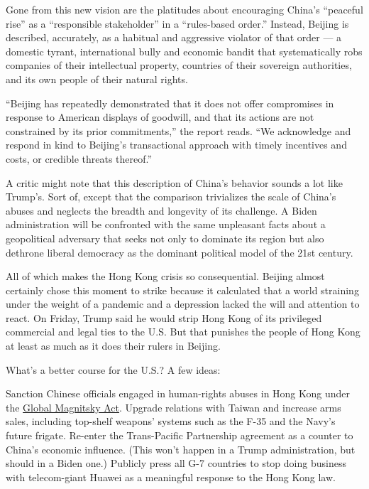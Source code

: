 Gone from this new vision are the platitudes about encouraging China's
``peaceful rise'' as a ``responsible stakeholder'' in a ``rules-based
order.'' Instead, Beijing is described, accurately, as a habitual and
aggressive violator of that order --- a domestic tyrant, international
bully and economic bandit that systematically robs companies of their
intellectual property, countries of their sovereign authorities, and its
own people of their natural rights.

``Beijing has repeatedly demonstrated that it does not offer compromises
in response to American displays of goodwill, and that its actions are
not constrained by its prior commitments,'' the report reads. ``We
acknowledge and respond in kind to Beijing's transactional approach with
timely incentives and costs, or credible threats thereof.''

A critic might note that this description of China's behavior sounds a
lot like Trump's. Sort of, except that the comparison trivializes the
scale of China's abuses and neglects the breadth and longevity of its
challenge. A Biden administration will be confronted with the same
unpleasant facts about a geopolitical adversary that seeks not only to
dominate its region but also dethrone liberal democracy as the dominant
political model of the 21st century.

All of which makes the Hong Kong crisis so consequential. Beijing almost
certainly chose this moment to strike because it calculated that a world
straining under the weight of a pandemic and a depression lacked the
will and attention to react. On Friday, Trump said he would strip Hong
Kong of its privileged commercial and legal ties to the U.S. But that
punishes the people of Hong Kong at least as much as it does their
rulers in Beijing.

What's a better course for the U.S.? A few ideas:

Sanction Chinese officials engaged in human-rights abuses in Hong Kong
under the
\href{https://www.congress.gov/bill/114th-congress/senate-bill/284/text/es}{Global
Magnitsky Act}. Upgrade relations with Taiwan and increase arms sales,
including top-shelf weapons' systems such as the F-35 and the Navy's
future frigate. Re-enter the Trans-Pacific Partnership agreement as a
counter to China's economic influence. (This won't happen in a Trump
administration, but should in a Biden one.) Publicly press all G-7
countries to stop doing business with telecom-giant Huawei as a
meaningful response to the Hong Kong law.

